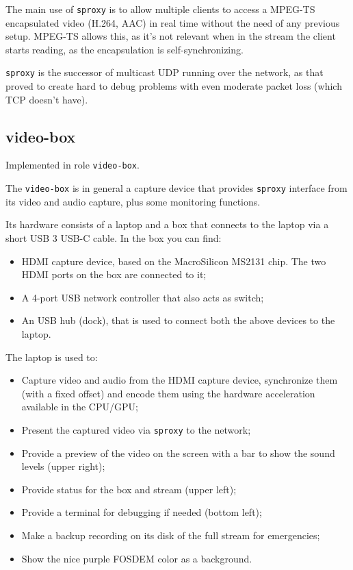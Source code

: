 \documentclass{article}
\begin{document}
The main use of \texttt{sproxy} is to allow multiple clients to access a MPEG-TS encapsulated video (H.264, AAC) in real time without the need of any previous setup. MPEG-TS allows this, as it's not relevant when in the stream the client starts reading, as the encapsulation is self-synchronizing.

\texttt{sproxy} is the successor of multicast UDP running over the network, as that proved to create hard to debug problems with even moderate packet loss (which TCP doesn't have).

\subsection{video-box}

Implemented in role \texttt{video-box}.

The \texttt{video-box} is in general a capture device that provides \texttt{sproxy} interface from its video and audio capture, plus some monitoring functions.

Its hardware consists of a laptop and a box that connects to the laptop via a short USB 3 USB-C cable. In the box you can find:

\begin{itemize}
  \item HDMI capture device, based on the MacroSilicon MS2131 chip. The two HDMI ports on the box are connected to it;
  \item A 4-port USB network controller that also acts as switch;
  \item An USB hub (dock), that is used to connect both the above devices to the laptop.
\end{itemize}

The laptop is used to:

\begin{itemize}
  \item Capture video and audio from the HDMI capture device, synchronize them (with a fixed offset) and encode them using the hardware acceleration available in the CPU/GPU;
  \item Present the captured video via \texttt{sproxy} to the network;
  \item Provide a preview of the video on the screen with a bar to show the sound levels (upper right);
  \item Provide status for the box and stream (upper left);
  \item Provide a terminal for debugging if needed (bottom left);
  \item Make a backup recording on its disk of the full stream for emergencies;
  \item Show the nice purple FOSDEM color as a background. 
\end{itemize}
\end{document}
